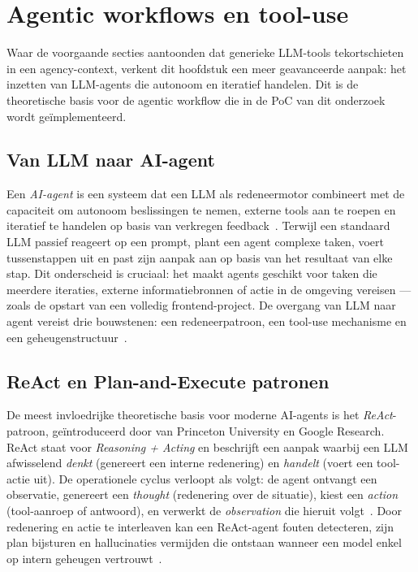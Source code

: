 \section{Agentic workflows en tool-use}
\label{sec:agentic-workflows}

Waar de voorgaande secties aantoonden dat generieke LLM-tools tekortschieten in een agency-context, verkent dit hoofdstuk een meer geavanceerde aanpak: het inzetten van LLM-agents die autonoom en iteratief handelen. Dit is de theoretische basis voor de agentic workflow die in de PoC van dit onderzoek wordt geïmplementeerd.

\subsection{Van LLM naar AI-agent}
\label{subsec:llm-naar-agent}

Een \textit{AI-agent} is een systeem dat een LLM als redeneermotor combineert met de capaciteit om autonoom beslissingen te nemen, externe tools aan te roepen en iteratief te handelen op basis van verkregen feedback~\autocite{IBMReAct2025}. Terwijl een standaard LLM passief reageert op een prompt, plant een agent complexe taken, voert tussenstappen uit en past zijn aanpak aan op basis van het resultaat van elke stap. Dit onderscheid is cruciaal: het maakt agents geschikt voor taken die meerdere iteraties, externe informatiebronnen of actie in de omgeving vereisen --- zoals de opstart van een volledig frontend-project. De overgang van LLM naar agent vereist drie bouwstenen: een redeneerpatroon, een tool-use mechanisme en een geheugenstructuur~\autocite{Rao2025}.

\subsection{ReAct en Plan-and-Execute patronen}
\label{subsec:react-plan-execute}

De meest invloedrijke theoretische basis voor moderne AI-agents is het \textit{ReAct}-patroon, geïntroduceerd door \textcite{YaoReAct2022} van Princeton University en Google Research. ReAct staat voor \textit{Reasoning + Acting} en beschrijft een aanpak waarbij een LLM afwisselend \textit{denkt} (genereert een interne redenering) en \textit{handelt} (voert een tool-actie uit). De operationele cyclus verloopt als volgt: de agent ontvangt een observatie, genereert een \textit{thought} (redenering over de situatie), kiest een \textit{action} (tool-aanroep of antwoord), en verwerkt de \textit{observation} die hieruit volgt~\autocite{IBMReAct2025}. Door redenering en actie te interleaven kan een ReAct-agent fouten detecteren, zijn plan bijsturen en hallucinaties vermijden die ontstaan wanneer een model enkel op intern geheugen vertrouwt~\autocite{YaoReAct2022}.

